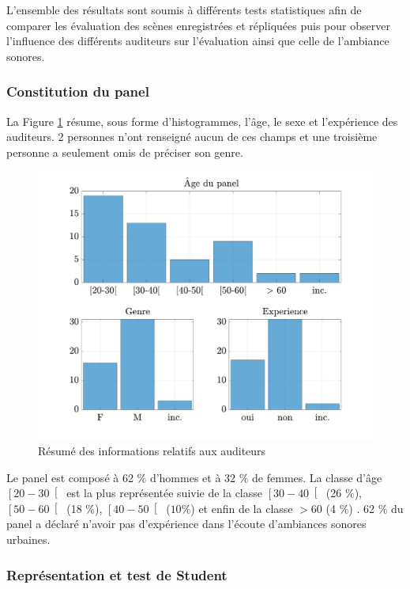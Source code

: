 L'ensemble des résultats sont soumis à différents tests statistiques afin de comparer les évaluation des scènes enregistrées et répliquées puis pour observer l'influence des différents auditeurs sur l'évaluation ainsi que celle de l'ambiance sonores.

\subsubsection{Constitution du panel}

La Figure \ref{fig:panelTest} résume, sous forme d'histogrammes, l'âge, le sexe et l'expérience des auditeurs. 2 personnes n'ont renseigné aucun de ces champs et une troisième personne a seulement omis de préciser son genre.\\

\begin{figure}[ht]
\centering
\includegraphics[width = .8\textwidth]{./figures/test_perceptif/testPerceptif_panel.pdf}
\caption{Résumé des informations relatifs aux auditeurs}
\label{fig:panelTest}
\end{figure}

Le panel est composé à 62 $\%$ d'hommes et à 32 $\%$ de femmes. La classe d'âge $\left[20-30\right[$ est la plus représentée suivie de la classe $\left[30-40\right[$ (26 $\%$), $\left[50-60\right[$ (18 $\%$), $\left[40-50\right[$ ($10\%$) et enfin de la classe $>60$ (4 $\%$) . 62 $\%$ du panel a déclaré n'avoir pas d'expérience dans l'écoute d'ambiances sonores urbaines.\\

\subsubsection{Représentation et test de Student}

